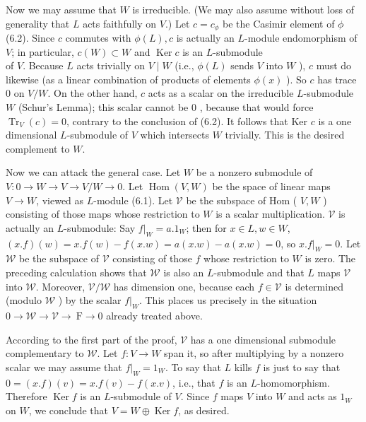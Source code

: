 \documentclass[10pt]{article}
\begin{document}
Now we may assume that $W$ is irreducible. (We may also assume without loss of generality that $L$ acts faithfully on $V$.) Let $c=c_{\phi}$ be the Casimir element of $\phi$ (6.2). Since $c$ commutes with $\phi(L), c$ is actually an $L$-module endomorphism of $V$; in particular, $c(W) \subset W$ and $\operatorname{Ker} c$ is an $L$-submodule\\
of $V$. Because $L$ acts trivially on $V \mid W$ (i.e., $\phi(L)$ sends $V$ into $W$ ), $c$ must do likewise (as a linear combination of products of elements $\phi(x)$ ). So $c$ has trace 0 on $V / W$. On the other hand, $c$ acts as a scalar on the irreducible $L$-submodule $W$ (Schur's Lemma); this scalar cannot be 0 , because that would force $\operatorname{Tr}_{V}(c)=0$, contrary to the conclusion of (6.2). It follows that Ker $c$ is a one dimensional $L$-submodule of $V$ which intersects $W$ trivially. This is the desired complement to $W$.

Now we can attack the general case. Let $W$ be a nonzero submodule of $V: 0 \rightarrow W \rightarrow V \rightarrow V / W \rightarrow 0$. Let $\operatorname{Hom}(V, W)$ be the space of linear maps $V \rightarrow W$, viewed as $L$-module (6.1). Let $\mathscr{V}$ be the subspace of Hom ( $V, W$ ) consisting of those maps whose restriction to $W$ is a scalar multiplication. $\mathscr{V}$ is actually an $L$-submodule: Say $\left.f\right|_{W}=a .1_{W}$; then for $x \in L, w \in W$, $(x . f)(w)=x . f(w)-f(x . w)=a(x . w)-a(x . w)=0$, so $x .\left.f\right|_{W}=0$. Let $\mathscr{W}$ be the subspace of $\mathscr{V}$ consisting of those $f$ whose restriction to $W$ is zero. The preceding calculation shows that $\mathscr{W}$ is also an $L$-submodule and that $L$ maps $\mathscr{V}$ into $\mathscr{W}$. Moreover, $\mathscr{V} / \mathscr{W}$ has dimension one, because each $f \in \mathscr{V}$ is determined (modulo $\mathscr{W}$ ) by the scalar $\left.f\right|_{W}$. This places us precisely in the situation $0 \rightarrow \mathscr{W} \rightarrow \mathscr{V} \rightarrow \mathrm{~F} \rightarrow 0$ already treated above.

According to the first part of the proof, $\mathscr{V}$ has a one dimensional submodule complementary to $\mathscr{W}$. Let $f: V \rightarrow W$ span it, so after multiplying by a nonzero scalar we may assume that $\left.f\right|_{W}=1_{W}$. To say that $L$ kills $f$ is just to say that $0=(x . f)(v)=x . f(v)-f(x . v)$, i.e., that $f$ is an $L$-homomorphism. Therefore $\operatorname{Ker} f$ is an $L$-submodule of $V$. Since $f$ maps $V$ into $W$ and acts as $1_{W}$ on $W$, we conclude that $V=W \oplus \operatorname{Ker} f$, as desired.
\end{document}
